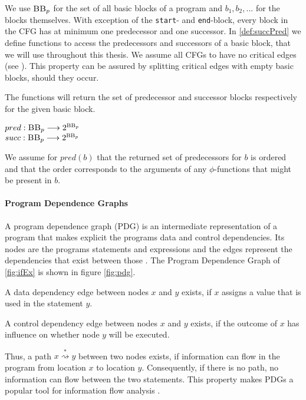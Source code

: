 We use $\mbb_p$ for the set of all basic blocks of a program \p and $b_1, b_2, ...$ for the blocks themselves. With exception of the \texttt{start}- and \texttt{end}-block, every block in the CFG has at minimum one predecessor and one successor. In \ref{def:succPred} we define functions to access the predecessors and successors of a basic block, that we will use throughout this thesis. We assume all CFGs to have no critical edges (see \cite{dragoonBook}). This property can be assured by splitting critical edges with empty basic blocks, should they occur. 

\begin{definition}\label{def:succPred}
    The functions will return the set of predecessor and successor blocks respectively for the given basic block.
    \begin{center}
        $pred: \textsc{BB}_p \longrightarrow 2^{\textsc{BB}_p}$\\
        $succ: \textsc{BB}_p \longrightarrow 2^{\textsc{BB}_p}$
    \end{center}
    We assume for $pred(b)$ that the returned set of predecessors for $b$ is ordered and that the order corresponds to the arguments of any $\phi$-functions that might be present in $b$.
\end{definition}

\paragraph{Program Dependence Graphs}
A program dependence graph (PDG) is an intermediate representation of a program that makes explicit the programs data and control dependencies. Its nodes are the programs statements and expressions and the edges represent the dependencies that exist between those \cite{ferrante87}. The Program Dependence Graph of \ref{fig:ifEx} is shown in figure \ref{fig:pdg}.

A data dependency edge between nodes $x$ and $y$ exists, if $x$ assigns a value that is used in the statement $y$.

A control dependency edge between nodes $x$ and $y$ exists, if the outcome of $x$ has influence on whether node $y$ will be executed.

Thus, a path $x \stackrel{*}{\rightsquigarrow } y$ between two nodes exists, if information can flow in the program from location $x$ to location $y$. Consequently, if there is no path, no information can flow between the two statements. This property makes PDGs a popular tool for information flow analysis \cite{horwitz88,giffhorn12}.

